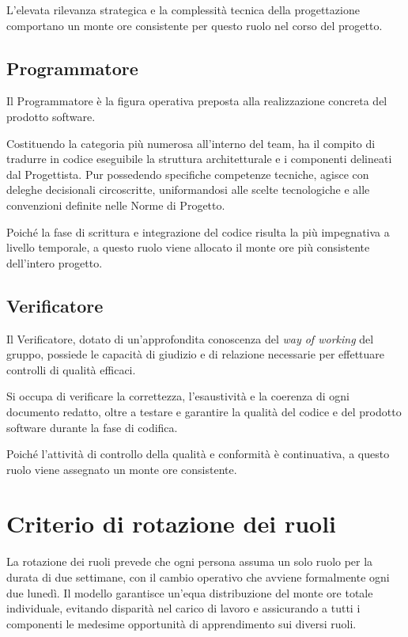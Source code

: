 \documentclass[documento]{gpt}
\begin{document}
L'elevata rilevanza strategica e la complessità tecnica della progettazione comportano un monte ore consistente per questo ruolo nel corso del progetto.

\subsection{Programmatore}
Il Programmatore è la figura operativa preposta alla realizzazione concreta del prodotto software.

Costituendo la categoria più numerosa all'interno del team, ha il compito di tradurre in codice eseguibile la struttura architetturale e i componenti delineati dal Progettista. Pur possedendo specifiche competenze tecniche, agisce con deleghe decisionali circoscritte, uniformandosi alle scelte tecnologiche e alle convenzioni definite nelle Norme di Progetto.

Poiché la fase di scrittura e integrazione del codice risulta la più impegnativa a livello temporale, a questo ruolo viene allocato il monte ore più consistente dell'intero progetto.

\subsection{Verificatore}
Il Verificatore, dotato di un'approfondita conoscenza del \textit{way of working} del gruppo, possiede le capacità di giudizio e di relazione necessarie per effettuare controlli di qualità efficaci.

Si occupa di verificare la correttezza, l'esaustività e la coerenza di ogni documento redatto, oltre a testare e garantire la qualità del codice e del prodotto software durante la fase di codifica.

Poiché l'attività di controllo della qualità e conformità è continuativa, a questo ruolo viene assegnato un monte ore consistente.

\section{Criterio di rotazione dei ruoli}
La rotazione dei ruoli prevede che ogni persona assuma un solo ruolo per la durata di due settimane, con il cambio operativo che avviene formalmente ogni due lunedì. Il modello garantisce un'equa distribuzione del monte ore totale individuale, evitando disparità nel carico di lavoro e assicurando a tutti i componenti le medesime opportunità di apprendimento sui diversi ruoli. 
\end{document}

